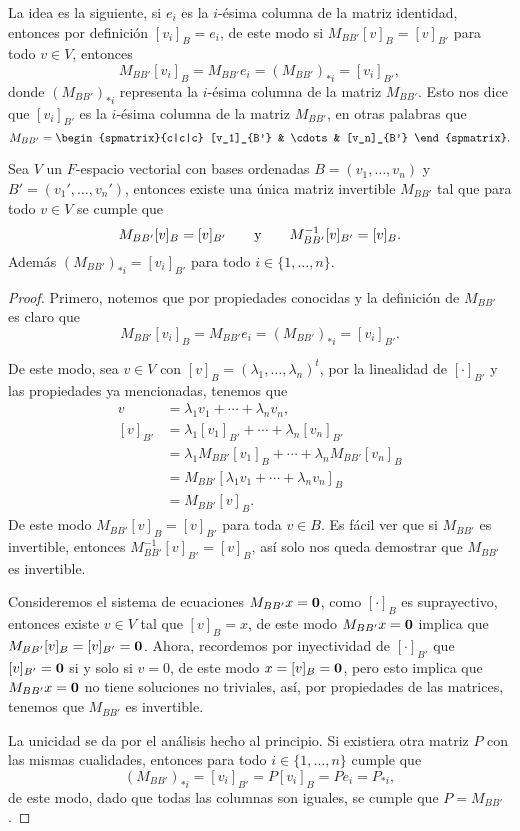 La idea es la siguiente, si $e_i$ es la $i$-ésima columna de la matriz identidad, entonces por definición $[v_i]_B = e_i$, de este modo si $M_{BB'} [v]_B = [v]_{B'}$ para todo $v \in V$, entonces
  \[ M_{BB'} [v_i]_B = M_{BB'} e_i = (M_{BB'})_{*i} = [v_i]_{B'},\]
donde $(M_{BB'})_{*i}$ representa la $i$-ésima columna de la matriz $M_{BB'}$.
Esto nos dice que $[v_i]_{B'}$ es la $i$-ésima columna de la matriz $M_{BB'}$, en otras palabras que
  \[ M_{BB'} = \begin{spmatrix}{c|c|c}  [v_1]_{B'} & \cdots & [v_n]_{B'}  \end{spmatrix}. \]

\begin{teor} \label{teor:CambioBase}
  Sea $V$ un $F$-espacio vectorial con bases ordenadas $B = (v_1,\ldots,v_n)$ y $B' = (v_1',\ldots,v_n')$, entonces existe una única matriz invertible $M_{BB'}$ tal que para todo $v \in V$ se cumple que
    \[ M_{BB'}[v]_B = [v]_{B'} \qquad\text{y}\qquad M_{BB'}^{-1}[v]_{B'} = [v]_B. \]
  Además $(M_{BB'})_{*i} = [v_i]_{B'}$ para todo $i \in \{1,\ldots,n\}$.
\end{teor}
\begin{proof}
  Primero, notemos que por propiedades conocidas y la definición de $M_{BB'}$ es claro que 
    \[ M_{BB'}[v_i]_B = M_{BB'} e_i =  (M_{BB'})_{*i} = [v_i]_{B'}. \]

  De este modo, sea $v \in V$ con $[v]_B = (\lambda_1,\ldots,\lambda_n)^t$, por la linealidad de $[\cdot]_{B'}$ y las propiedades ya mencionadas, tenemos que
    \begin{align*}
      v        &= \lambda_1 v_1 + \cdots + \lambda_n v_n, \\
      [v]_{B'} &= \lambda_1 [v_1]_{B'} + \cdots + \lambda_n [v_n]_{B'} \\
               &= \lambda_1 M_{BB'}[v_1]_B + \cdots + \lambda_n M_{BB'}[v_n]_B \\
               &= M_{BB'} [\lambda_1 v_1 + \cdots + \lambda_n v_n ]_B \\
               &= M_{BB'} [ v ]_B.
    \end{align*}
  De este modo $M_{BB'}[v]_B = [v]_{B'}$ para toda $v \in B$. Es fácil ver que si $M_{BB'}$ es invertible, entonces $M_{BB'}^{-1}[v]_{B'} = [v]_B$, así solo nos queda demostrar que $M_{BB'}$ es invertible.
  
  Consideremos el sistema de ecuaciones $M_{BB'}x = \mathbf{0}$, como $[\cdot]_B$ es suprayectivo, entonces existe $v \in V$ tal que $[v]_B = x$, de este modo $M_{BB'}x = \mathbf{0}$ implica que $M_{BB'}[v]_B = [v]_{B'} = \mathbf{0}$. Ahora, recordemos por inyectividad de $[\cdot]_{B'}$ que $[v]_{B'} = \mathbf{0}$ si y solo si $v = 0$, de este modo $x = [v]_{B} = \mathbf{0}$, pero esto implica que $M_{BB'}x = \mathbf{0}$ no tiene soluciones no triviales, así, por propiedades de las matrices, tenemos que $M_{BB'}$ es invertible.

  La unicidad se da por el análisis hecho al principio. Si existiera otra matriz $P$ con las mismas cualidades, entonces para todo $i \in \{1,\ldots, n\}$ cumple que
  \[ (M_{BB'})_{*i} = [v_i]_{B'} = P[v_i]_{B} = Pe_i = P_{*i},\]
  de este modo, dado que todas las columnas son iguales, se cumple que $P = M_{BB'}$.
\end{proof}

